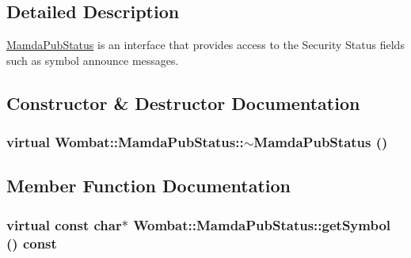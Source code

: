 \subsection{Detailed Description}
\hyperlink{classWombat_1_1MamdaPubStatus}{Mamda\-Pub\-Status} is an interface that provides access to the Security Status fields such as symbol announce messages. 



\subsection{Constructor \& Destructor Documentation}
\hypertarget{classWombat_1_1MamdaPubStatus_e176b4d51082ef05d032d36ccfa88011}{
\subsubsection[$\sim$MamdaPubStatus]{\setlength{\rightskip}{0pt plus 5cm}virtual Wombat::Mamda\-Pub\-Status::$\sim$Mamda\-Pub\-Status ()}}
\label{classWombat_1_1MamdaPubStatus_e176b4d51082ef05d032d36ccfa88011}




\subsection{Member Function Documentation}
\hypertarget{classWombat_1_1MamdaPubStatus_a891a47fbe902368dbf46ab84773eff9}{
\subsubsection[getSymbol]{\setlength{\rightskip}{0pt plus 5cm}virtual const char$\ast$ Wombat::Mamda\-Pub\-Status::get\-Symbol () const}}
\label{classWombat_1_1MamdaPubStatus_a891a47fbe902368dbf46ab84773eff9}




